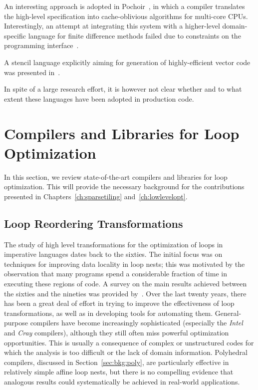 An interesting approach is adopted in Pochoir~\citep{pochoir}, in which a compiler translates the high-level specification into cache-oblivious algorithms for multi-core CPUs. Interestingly, an attempt at integrating this system with a higher-level domain-specific language for finite difference methods failed due to constraints on the programming interface~\citep{TJ-OPESCI}. 

A stencil language explicitly aiming for generation of highly-efficient vector code was presented in~\cite{stencil-compiler}.

In spite of a large research effort, it is however not clear whether and to what extent these languages have been adopted in production code. 


\section{Compilers and Libraries for Loop Optimization}
\label{sec:bkg:codeopt}
In this section, we review state-of-the-art compilers and libraries for loop optimization. This will provide the necessary background for the contributions presented in Chapters~\ref{ch:sparsetiling} and~\ref{ch:lowlevelopt}.

\subsection{Loop Reordering Transformations}
\label{sec:bkg:loop-transf}
The study of high level transformations for the optimization of loops in imperative languages dates back to the sixties. The initial focus was on techniques for improving data locality in loop nests; this was motivated by the observation that many programs spend a considerable fraction of time in executing these regions of code. A survey on the main results achieved between the sixties and the nineties was provided by~\cite{bacon-comp-transf}. Over the last twenty years, there has been a great deal of effort in trying to improve the effectiveness of loop transformations, as well as in developing tools for automating them. General-purpose compilers have become increasingly sophisticated (especially the {\em Intel} and {\em Cray} compilers), although they still often miss powerful optimization opportunities. This is usually a consequence of complex or unstructured codes for which the analysis is too difficult or the lack of domain information. Polyhedral compilers, discussed in Section~\ref{sec:bkg:poly}, are particularly effective in relatively simple affine loop nests, but there is no compelling evidence that analogous results could systematically be achieved in real-world applications.

